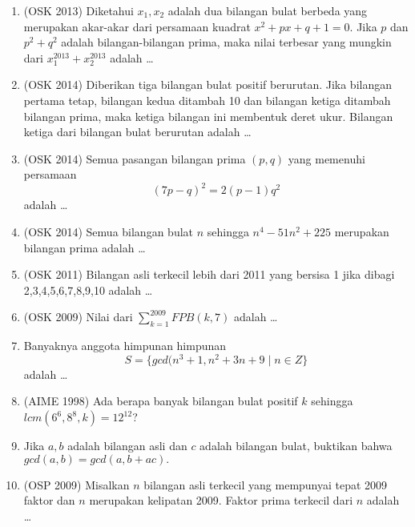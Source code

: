 \documentclass[11pt]{scrartcl}
\begin{document}
\begin{enumerate}
            \item (OSK 2013) Diketahui $x_1,x_2$ adalah dua bilangan bulat berbeda yang merupakan akar-akar dari persamaan kuadrat $x^2+px+q+1=0$. Jika $p$ dan $p^2+q^2$ adalah bilangan-bilangan prima, maka nilai terbesar yang mungkin dari $x_1^{2013}+x_2^{2013}$ adalah \dots
            
            \item (OSK 2014) Diberikan tiga bilangan bulat positif berurutan. Jika bilangan pertama tetap, bilangan kedua ditambah 10 dan bilangan ketiga ditambah bilangan prima, maka ketiga bilangan ini membentuk deret ukur. Bilangan ketiga dari bilangan bulat berurutan adalah \dots
            
            \item (OSK 2014) Semua pasangan bilangan prima $(p,q)$ yang memenuhi persamaan
            $$(7p-q)^2=2(p-1)q^2$$
            adalah \dots
            
            \item (OSK 2014) Semua bilangan bulat $n$ sehingga $n^4-51n^2+225$ merupakan bilangan prima adalah \dots
            
            \item (OSK 2011) Bilangan asli terkecil lebih dari 2011 yang bersisa 1 jika dibagi 2,3,4,5,6,7,8,9,10 adalah \dots
                    
                    \item (OSK 2009) Nilai dari $\sum_{k=1}^{2009} FPB(k,7)$ adalah \dots
                    
                    \item Banyaknya anggota himpunan himpunan 
                    $$S = \{gcd(n^3+1,n^2+3n+9 \mid n \in Z\}$$
                    adalah \dots
                    
                    \item (AIME 1998) Ada berapa banyak bilangan bulat positif $k$ sehingga $lcm(6^6,8^8,k)=12^{12}$?
                    
                    \item Jika $a,b$ adalah bilangan asli dan $c$ adalah bilangan bulat, buktikan bahwa $gcd(a,b)=gcd(a,b+ac).$
                    
                    \item (OSP 2009) Misalkan $n$ bilangan asli terkecil yang mempunyai tepat 2009 faktor dan $n$ merupakan kelipatan 2009. Faktor prima terkecil dari $n$ adalah \dots
                    

\end{enumerate}
\end{document}
